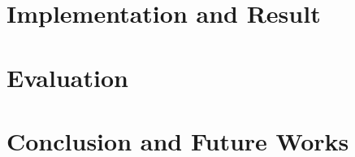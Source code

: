 \documentclass[12pt, twoside]{report}
\makeatletter
\newcommand\AppendixName{Appendix}
\let\oldappendix\appendix
\renewcommand{\appendix}{%
  \oldappendix
  \renewcommand{\chaptername}{\AppendixName}  \renewcommand{\thechapter}{\@Alph\c@chapter}}
\makeatother
\begin{document}
\chapter{Implementation and Result}


\chapter{Evaluation}


\chapter{Conclusion and Future Works}






\appendix

\end{document}
